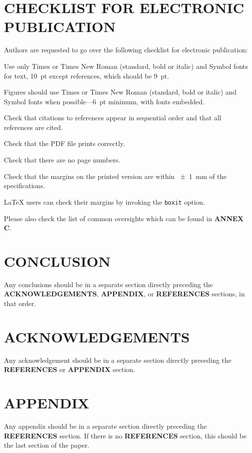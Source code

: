\documentclass[a4paper,
               keeplastbox,   %
               ]{jacow}
\begin{document}
\section{CHECKLIST FOR ELECTRONIC PUBLICATION}
Authors are requested to go over the following checklist for electronic publication:
\begin{Itemize}
	\item  Use only Times or Times New Roman (standard, bold or italic) and Symbol
	fonts for text, \SI{10}{pt} except references, which should be \SI{9}{pt}.
	
	\item  Figures should use Times or Times New Roman (standard, bold or italic) and
	Symbol fonts when possible---\SI{6}{pt} minimum, with fonts embedded.
	\item  Check that citations to references appear in sequential order and
	that all references are cited.
	\item  Check that the PDF file prints correctly.
	\item  Check that there are no page numbers.
	\item  Check that the margins on the printed version are within \SI{\pm1}{mm}
	of the specifications.
	\item  \LaTeX{} users can check their margins by invoking the
	\texttt{boxit} option.
\end{Itemize}

Please also check the list of common oversights which can be found in \textbf{ANNEX C}.

\section{CONCLUSION}

Any conclusions should be in a separate section directly preceding
the \textbf{ACKNOWLEDGEMENTS}, \textbf{APPENDIX}, or \textbf{REFERENCES} sections, in that
order.

\section{ACKNOWLEDGEMENTS}
Any acknowledgement should be in a separate section directly preceding
the \textbf{REFERENCES} or \textbf{APPENDIX} section.


\section{APPENDIX}
Any appendix should be in a separate section directly preceding
the \textbf{REFERENCES} section. If there is no \textbf{REFERENCES} section,
this should be the last section of the paper.
\end{document}
